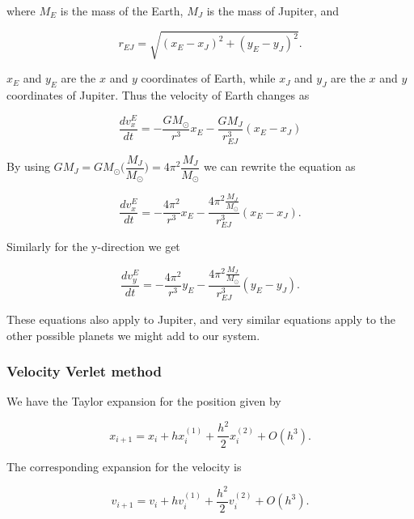 \documentclass[a4paper, fontsize=11pt]{article}
\begin{document}
where $M_{E}$ is the mass of the Earth, $M_{J}$ is the mass of Jupiter, and 

\begin{equation}
r_{EJ}=\sqrt{(x_{E}-x_{J})^2 + (y_{E}- y_{J})^2 }.
\end{equation}

$x_{E}$ and $y_{E}$ are the $x$ and $y$ coordinates of Earth, while $x_{J}$ and $y_{J}$ are the $x$ and $y$ coordinates of Jupiter. Thus the velocity of Earth changes as

\begin{equation}
\dfrac{dv_{x}^{E}}{dt}=-\dfrac{G M_{\odot}}{r^3}x_{E} - \dfrac{G M_{J}}{r_{EJ}^3}(x_{E}-x_{J})
\end{equation}

By using $G M_{J} = G M_{\odot} \Big(\dfrac{M_{J}}{M_{\odot}}\Big)=4\pi^2 \dfrac{M_{J}}{M_{\odot}}$ we can rewrite the equation as

\begin{equation}
\dfrac{dv_{x}^{E}}{dt}=-\dfrac{4\pi^2}{r^3}x_{E} - \dfrac{4\pi^2 \frac{M_{J}}{M_{\odot}} }{r_{EJ}^3}(x_{E}-x_{J}).
\end{equation}

Similarly for the y-direction we get

\begin{equation}
\dfrac{dv_{y}^{E}}{dt}=-\dfrac{4\pi^2}{r^3}y_{E} - \dfrac{4\pi^2 \frac{M_{J}}{M_{\odot}} }{r_{EJ}^3}(y_{E}-y_{J}).
\end{equation}

These equations also apply to Jupiter, and very similar equations apply to the other possible planets we might add to our system. \cite{ODE}




\subsubsection{Velocity Verlet method}
We have the Taylor expansion for the position given by

\begin{equation}
x_{i+1}=x_{i} + h x_{i}^{(1)} + \dfrac{h^2}{2} x_{i}^{(2)} + O(h^3).
\end{equation}

The corresponding expansion for the velocity is 

\begin{equation}
v_{i+1} = v_{i} +h v_{i}^{(1)} + \dfrac{h^2}{2} v_{i}^{(2)} + O(h^3).
\end{equation}
\end{document}
